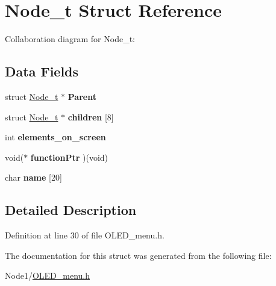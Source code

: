 \hypertarget{structNode__t}{}\section{Node\+\_\+t Struct Reference}
\label{structNode__t}


Collaboration diagram for Node\+\_\+t\+:
\subsection*{Data Fields}
\begin{DoxyCompactItemize}
\item 
\mbox{\label{structNode__t_ae9a007f68638f0b0498e18c56254e5cb}} 
struct \hyperlink{structNode__t}{Node\+\_\+t} $\ast$ {\bfseries Parent}
\item 
\mbox{\label{structNode__t_aa3195ca7a9e9d8676b6c43bea80ba432}} 
struct \hyperlink{structNode__t}{Node\+\_\+t} $\ast$ {\bfseries children} \mbox{[}8\mbox{]}
\item 
\mbox{\label{structNode__t_ae2c9d426c164e5e8247f705ad01f1cfb}} 
int {\bfseries elements\+\_\+on\+\_\+screen}
\item 
\mbox{\label{structNode__t_aa9c4643b3bd24c732c48cac981e29df7}} 
void($\ast$ {\bfseries function\+Ptr} )(void)
\item 
\mbox{\label{structNode__t_adc34669732a91f9e2c1b9bc5aae7c12b}} 
char {\bfseries name} \mbox{[}20\mbox{]}
\end{DoxyCompactItemize}


\subsection{Detailed Description}


Definition at line 30 of file O\+L\+E\+D\+\_\+menu.\+h.



The documentation for this struct was generated from the following file\+:\begin{DoxyCompactItemize}
\item 
Node1/\hyperlink{OLED__menu_8h}{O\+L\+E\+D\+\_\+menu.\+h}\end{DoxyCompactItemize}
